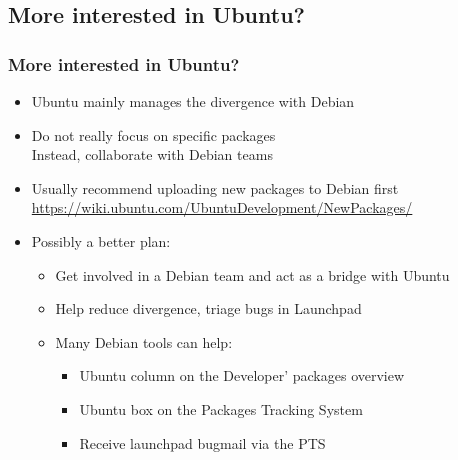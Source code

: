 \documentclass[10pt,final]{beamer}
\begin{document}
\subsection{More interested in Ubuntu?}
\begin{frame}
\frametitle{More interested in Ubuntu?}
\begin{itemize}
	\item Ubuntu mainly manages the divergence with Debian
	\br
	\item Do not really focus on specific packages\\
		Instead, collaborate with Debian teams
	\br
	\item Usually recommend uploading new packages to Debian first\\
		\url{https://wiki.ubuntu.com/UbuntuDevelopment/NewPackages/}
	\br
	\item Possibly a better plan:
	\begin{itemize}
		\item Get involved in a Debian team and act as a bridge with Ubuntu
			\hbr
		\item Help reduce divergence, triage bugs in Launchpad
			\hbr
		\item Many Debian tools can help:
		\begin{itemize}
		\item Ubuntu column on the Developer' packages overview
		\item Ubuntu box on the Packages Tracking System
		\item Receive launchpad bugmail via the PTS
		\end{itemize}
	\end{itemize}
\end{itemize}
\end{frame}
\end{document}
